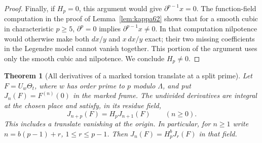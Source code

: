 \documentclass[a4paper,11pt]{article}
\newtheorem{theorem}[proposition]{Theorem}
\theoremstyle{definition}
\theoremstyle{remark}
\numberwithin{equation}{section}
\begin{document}
\begin{proof}
Finally, if \(H_p=0\), this argument would give
\(\partial^{p-1}x=0\). The function-field computation in the
proof of Lemma~\ref{lem:kappa62} shows that for a smooth cubic in
characteristic \(p\ge5\), \(\partial^p=0\) implies
\(\partial^{p-1}x\ne0\). In that computation nilpotence would
otherwise make both \(dx/y\) and \(x\,dx/y\) exact; their two
missing coefficients in the Legendre model cannot vanish
together. This portion of the argument uses only the smooth
cubic and nilpotence. We conclude \(H_p\ne0\).
\end{proof}

\begin{theorem}[All derivatives of a marked torsion translate at a split prime]\leavevmode
\label{thm:splitjets480}
Let \(F=U_w\Theta_t\), where \(w\) has order prime to \(p\) modulo
\(\Lambda\), and put \(J_n(F)=F^{(n)}(0)\) in the marked frame.
The undivided derivatives are integral at the chosen place and
satisfy, in its residue field,
\[
                    J_{n+p}(F)=H_pJ_{n+1}(F)
                           \qquad(n\ge0).
\]
This includes a translate vanishing at the origin. In particular,
for \(n\ge1\) write \(n=b(p-1)+r\), \(1\le r\le p-1\).
Then \(J_n(F)=H_p^bJ_r(F)\) in that field.
\end{theorem}
\end{document}
